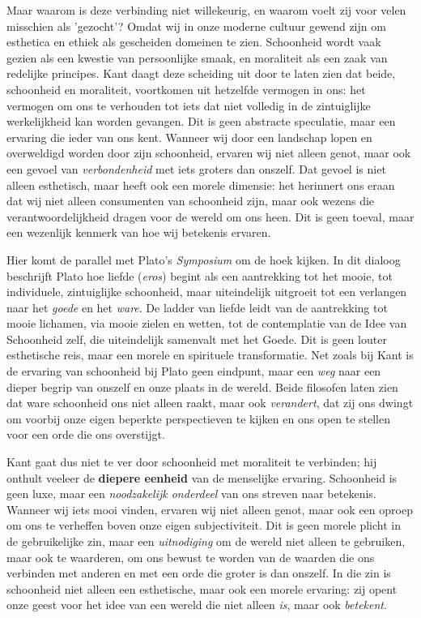 \begin{mdframed}[leftmargin=0pt,rightmargin=0pt,backgroundcolor=blue!6,linecolor=white,innertopmargin=6pt,innerbottommargin=6pt]
Maar waarom is deze verbinding niet willekeurig, en waarom voelt zij voor velen misschien als 'gezocht'? Omdat wij in onze moderne cultuur gewend zijn om esthetica en ethiek als gescheiden domeinen te zien. Schoonheid wordt vaak gezien als een kwestie van persoonlijke smaak, en moraliteit als een zaak van redelijke principes. Kant daagt deze scheiding uit door te laten zien dat beide, schoonheid en moraliteit, voortkomen uit hetzelfde vermogen in ons: het vermogen om ons te verhouden tot iets dat niet volledig in de zintuiglijke werkelijkheid kan worden gevangen. Dit is geen abstracte speculatie, maar een ervaring die ieder van ons kent. Wanneer wij door een landschap lopen en overweldigd worden door zijn schoonheid, ervaren wij niet alleen genot, maar ook een gevoel van \textit{verbondenheid} met iets groters dan onszelf. Dat gevoel is niet alleen esthetisch, maar heeft ook een morele dimensie: het herinnert ons eraan dat wij niet alleen consumenten van schoonheid zijn, maar ook wezens die verantwoordelijkheid dragen voor de wereld om ons heen. Dit is geen toeval, maar een wezenlijk kenmerk van hoe wij betekenis ervaren.

Hier komt de parallel met Plato's \textit{Symposium} om de hoek kijken. In dit dialoog beschrijft Plato hoe liefde (\textit{eros}) begint als een aantrekking tot het mooie, tot individuele, zintuiglijke schoonheid, maar uiteindelijk uitgroeit tot een verlangen naar het \textit{goede} en het \textit{ware}. De ladder van liefde leidt van de aantrekking tot mooie lichamen, via mooie zielen en wetten, tot de contemplatie van de Idee van Schoonheid zelf, die uiteindelijk samenvalt met het Goede. Dit is geen louter esthetische reis, maar een morele en spirituele transformatie. Net zoals bij Kant is de ervaring van schoonheid bij Plato geen eindpunt, maar een \textit{weg} naar een dieper begrip van onszelf en onze plaats in de wereld. Beide filosofen laten zien dat ware schoonheid ons niet alleen raakt, maar ook \textit{verandert}, dat zij ons dwingt om voorbij onze eigen beperkte perspectieven te kijken en ons open te stellen voor een orde die ons overstijgt.

Kant gaat dus niet te ver door schoonheid met moraliteit te verbinden; hij onthult veeleer de \textbf{diepere eenheid} van de menselijke ervaring. Schoonheid is geen luxe, maar een \textit{noodzakelijk onderdeel} van ons streven naar betekenis. Wanneer wij iets mooi vinden, ervaren wij niet alleen genot, maar ook een oproep om ons te verheffen boven onze eigen subjectiviteit. Dit is geen morele plicht in de gebruikelijke zin, maar een \textit{uitnodiging} om de wereld niet alleen te gebruiken, maar ook te waarderen, om ons bewust te worden van de waarden die ons verbinden met anderen en met een orde die groter is dan onszelf. In die zin is schoonheid niet alleen een esthetische, maar ook een morele ervaring: zij opent onze geest voor het idee van een wereld die niet alleen \textit{is}, maar ook \textit{betekent}.


\end{mdframed}

